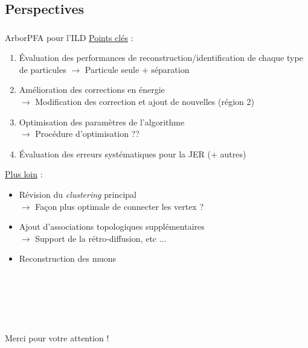 \documentclass[8pt]{beamer}
\begin{document}
  \subsection*{Perspectives}

  \begin{frame}
  \frametitle{\secname}
  \framesubtitle{\subsecname}
    \begin{block}{ArborPFA pour l'ILD}
      \underline{Points clés} :
      \begin{enumerate}
        \item Évaluation des performances de reconstruction/identification de chaque type de particules
        $\rightarrow$ Particule seule + séparation
        \item Amélioration des corrections en énergie \\
        $\rightarrow$ Modification des correction et ajout de nouvelles (région 2)
        \item Optimisation des paramètres de l'algorithme \\
        $\rightarrow$ Procédure d'optimisation ??
        \item Évaluation des erreurs systématiques pour la JER (+ autres)
      \end{enumerate}
      \underline{Plus loin} :
      \begin{itemize}
        \item Révision du \textit{clustering} principal \\
        $\rightarrow$ Façon plus optimale de connecter les vertex ?
        \item Ajout d'associations topologiques supplémentaires \\
        $\rightarrow$ Support de la rétro-diffusion, etc ...
        \item Reconstruction des muons
      \end{itemize}
    \end{block}
  \end{frame}



  \begin{frame}
    \begin{center}
      ~ \\
      ~ \\
      ~ \\
      ~ \\
      ~ \\
      \Large Merci pour votre attention !
    \end{center}
  \end{frame}
\end{document}

